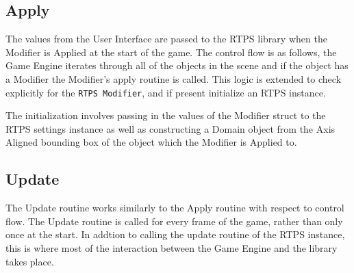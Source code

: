\subsection{Apply}
The values from the User Interface are passed to the RTPS library when the
Modifier is Applied at the start of the game. The control flow is as follows,
the Game Engine iterates through all of the objects in the scene and if the
object has a Modifier the Modifier's apply routine is called. This logic is
extended to check explicitly for the \verb|RTPS Modifier|, and if present initialize
an RTPS instance.


The initialization involves passing in the values of the Modifier struct to the
RTPS settings instance as well as constructing a Domain object from the Axis
Aligned bounding box of the object which the Modifier is Applied to.

\subsection{Update}

The Update routine works similarly to the Apply routine with respect to control
flow. The Update routine is called for every frame of the game, rather than
only once at the start. In addtion to calling the update routine of the RTPS
instance, this is where most of the interaction between the Game Engine and the
library takes place.

